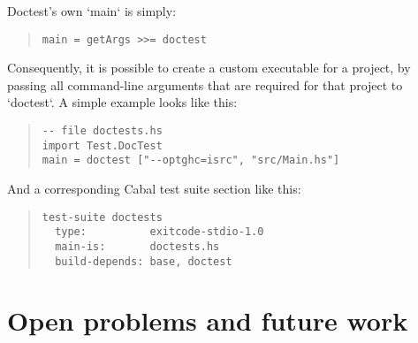 \documentclass[preprint]{sigplanconf}
\begin{document}
\noindent Doctest's own `main` is simply:
\begin{quote}
\small
\begin{verbatim}
main = getArgs >>= doctest
\end{verbatim}
\end{quote}



\noindent Consequently, it is possible to create a custom executable
for a project, by passing all command-line arguments that are required
for that project to `doctest`.  A simple example looks like this:

\begin{quote}
\small
\begin{verbatim}
-- file doctests.hs
import Test.DocTest
main = doctest ["--optghc=isrc", "src/Main.hs"]
\end{verbatim}
\end{quote}

\noindent And a corresponding Cabal test suite section like this:

\begin{quote}
\small
\begin{verbatim}
test-suite doctests
  type:          exitcode-stdio-1.0
  main-is:       doctests.hs
  build-depends: base, doctest
\end{verbatim}
\end{quote}

\section{Open problems and future work}
\end{document}
